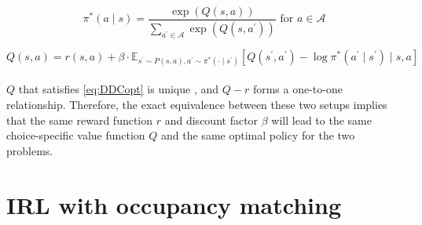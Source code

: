 $$
\pi^*(a \mid s) =\frac{\exp \left({Q(s, a)}\right)}{\sum_{a^\prime\in \mathcal{A}} \exp \left({Q(s, a^\prime)}\right)} \text{ for } a\in \mathcal{A} 
$$

$$
Q(s,a) = r\left(s, a\right)+\beta \cdot \mathbb{E}_{s^\prime \sim P(s, a), a^\prime \sim \pi^*(\cdot\mid s^\prime)}\left[Q(s^\prime, a^\prime) - \log  \pi^*(a^\prime \mid s^\prime) \mid s, a\right]
$$
\\
$Q$ that satisfies \ref{eq:DDCopt} is unique \cite{rust1994structural}, and $Q-r$ forms a one-to-one relationship. Therefore, the exact equivalence between these two setups implies that the same reward function $r$ and discount factor $\beta$ will lead to the same choice-specific value function $Q$ and the same optimal policy for the two problems.


\section{IRL with occupancy matching}\label{sec:occupancy}

